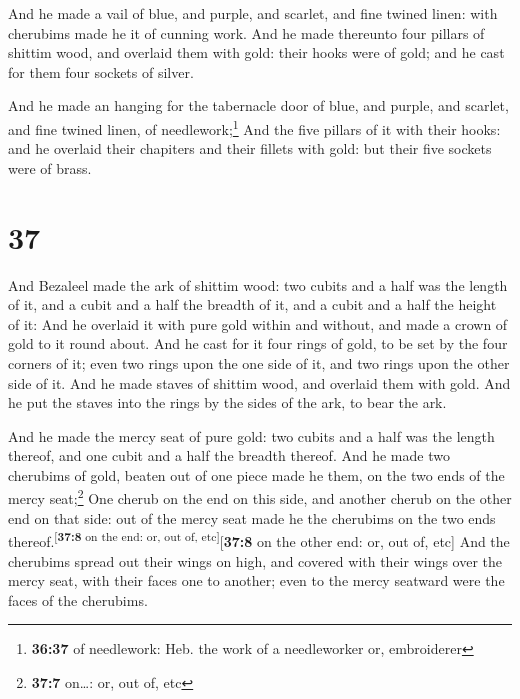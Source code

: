  And he made a vail of blue, and purple, and scarlet, and
fine twined linen: with cherubims made he it of cunning work.
 And he made thereunto four pillars of shittim wood, and
overlaid them with gold: their hooks were of gold; and he cast for them
four sockets of silver.

 And he made an hanging for the tabernacle door of blue,
and purple, and scarlet, and fine twined linen, of
needlework;\footnote{\textbf{36:37} of needlework: Heb. the work of a
  needleworker or, embroiderer}  And the five pillars of
it with their hooks: and he overlaid their chapiters and their fillets
with gold: but their five sockets were of brass.

\hypertarget{section-36}{%
\section{37}\label{section-36}}

 And Bezaleel made the ark of shittim wood: two cubits and
a half was the length of it, and a cubit and a half the breadth of it,
and a cubit and a half the height of it:  And he overlaid
it with pure gold within and without, and made a crown of gold to it
round about.  And he cast for it four rings of gold, to be
set by the four corners of it; even two rings upon the one side of it,
and two rings upon the other side of it.  And he made
staves of shittim wood, and overlaid them with gold.  And
he put the staves into the rings by the sides of the ark, to bear the
ark.

 And he made the mercy seat of pure gold: two cubits and a
half was the length thereof, and one cubit and a half the breadth
thereof.  And he made two cherubims of gold, beaten out of
one piece made he them, on the two ends of the mercy seat;\footnote{\textbf{37:7}
  on\ldots: or, out of, etc}  One cherub on the end on
this side, and another cherub on the other end on that side: out of the
mercy seat made he the cherubims on the two ends
thereof.\textsuperscript{{[}\textbf{37:8} on the end: or, out of,
etc{]}}{[}\textbf{37:8} on the other end: or, out of, etc{]}
 And the cherubims spread out their wings on high, and
covered with their wings over the mercy seat, with their faces one to
another; even to the mercy seatward were the faces of the cherubims.

